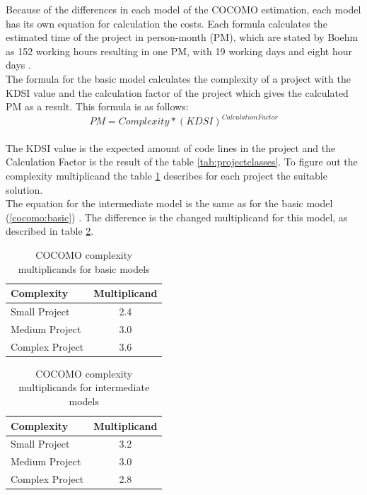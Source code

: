 Because of the differences in each model of the COCOMO estimation, each model has its own equation for calculation the costs. Each formula calculates the estimated time of the project in person-month (PM), which are stated by Boehm as 152 working hours resulting in one PM, with 19 working days and eight hour days \cite{boehm}. \\
The formula for the basic model calculates the complexity of a project with the KDSI value and the calculation factor of the project which gives the calculated PM as a result. This formula is as follows:\\
\begin{equation}
PM = Complexity * (KDSI)^{Calculation Factor} \label{cocomo:basic}
\end{equation}\\
The KDSI value is the expected amount of code lines in the project and the Calculation Factor is the result of the table \ref{tab:projectclasses}. To figure out the complexity multiplicand the table \ref{cocomo:basicComplexity} describes for each project the suitable solution.\\
The equation for the intermediate model is the same as for the basic model (\ref{cocomo:basic}) \cite{boehm}. The difference is the changed multiplicand for this model, as described in table \ref{cocomo:intermediateComplexity}.\\
\begin{table}[h]
	\centering 
	\setlength{\tabcolsep}{4pt}
	\begin{tabular}{|l||c|}\hline
		Complexity	& Multiplicand\\ \hline\hline
		Small Project   	& 2.4        		\\ \hline
		Medium Project 		& 3.0        		\\ \hline
		Complex Project 	& 3.6 			\\ \hline
	\end{tabular} 
	\caption{COCOMO complexity multiplicands for basic models} 
	\label{cocomo:basicComplexity} 
\end{table}
\begin{table}[h]
	\centering 
	\setlength{\tabcolsep}{4pt}
	\begin{tabular}{|l||c|}\hline
		Complexity	& Multiplicand\\ \hline\hline
		Small Project   	& 3.2        		\\ \hline
		Medium Project 		& 3.0        		\\ \hline
		Complex Project 	& 2.8 			\\ \hline
	\end{tabular} 
	\caption{COCOMO complexity multiplicands for intermediate models} 
	\label{cocomo:intermediateComplexity} 
\end{table}\\
